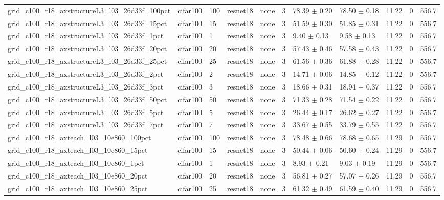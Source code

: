\begin{tabular}{lllllllllll}
grid_c100_r18_axstructureL3_l03_26d33f_100pct & cifar100 & 100 & resnet18 & none & 3 & 78.39 $\pm$ 0.20 & 78.50 $\pm$ 0.18 & 11.22 & 0 & 556.7 \\
grid_c100_r18_axstructureL3_l03_26d33f_15pct & cifar100 & 15 & resnet18 & none & 3 & 51.59 $\pm$ 0.30 & 51.85 $\pm$ 0.31 & 11.22 & 0 & 556.7 \\
grid_c100_r18_axstructureL3_l03_26d33f_1pct & cifar100 & 1 & resnet18 & none & 3 & 9.40 $\pm$ 0.13 & 9.58 $\pm$ 0.13 & 11.22 & 0 & 556.7 \\
grid_c100_r18_axstructureL3_l03_26d33f_20pct & cifar100 & 20 & resnet18 & none & 3 & 57.43 $\pm$ 0.46 & 57.58 $\pm$ 0.43 & 11.22 & 0 & 556.7 \\
grid_c100_r18_axstructureL3_l03_26d33f_25pct & cifar100 & 25 & resnet18 & none & 3 & 61.56 $\pm$ 0.36 & 61.88 $\pm$ 0.28 & 11.22 & 0 & 556.7 \\
grid_c100_r18_axstructureL3_l03_26d33f_2pct & cifar100 & 2 & resnet18 & none & 3 & 14.71 $\pm$ 0.06 & 14.85 $\pm$ 0.12 & 11.22 & 0 & 556.7 \\
grid_c100_r18_axstructureL3_l03_26d33f_3pct & cifar100 & 3 & resnet18 & none & 3 & 18.66 $\pm$ 0.31 & 18.94 $\pm$ 0.37 & 11.22 & 0 & 556.7 \\
grid_c100_r18_axstructureL3_l03_26d33f_50pct & cifar100 & 50 & resnet18 & none & 3 & 71.33 $\pm$ 0.28 & 71.54 $\pm$ 0.22 & 11.22 & 0 & 556.7 \\
grid_c100_r18_axstructureL3_l03_26d33f_5pct & cifar100 & 5 & resnet18 & none & 3 & 26.44 $\pm$ 0.17 & 26.62 $\pm$ 0.27 & 11.22 & 0 & 556.7 \\
grid_c100_r18_axstructureL3_l03_26d33f_7pct & cifar100 & 7 & resnet18 & none & 3 & 33.67 $\pm$ 0.55 & 33.79 $\pm$ 0.55 & 11.22 & 0 & 556.7 \\
grid_c100_r18_axteach_l03_10e860_100pct & cifar100 & 100 & resnet18 & none & 3 & 78.48 $\pm$ 0.66 & 78.68 $\pm$ 0.65 & 11.29 & 0 & 556.7 \\
grid_c100_r18_axteach_l03_10e860_15pct & cifar100 & 15 & resnet18 & none & 3 & 50.44 $\pm$ 0.06 & 50.60 $\pm$ 0.24 & 11.29 & 0 & 556.7 \\
grid_c100_r18_axteach_l03_10e860_1pct & cifar100 & 1 & resnet18 & none & 3 & 8.93 $\pm$ 0.21 & 9.03 $\pm$ 0.19 & 11.29 & 0 & 556.7 \\
grid_c100_r18_axteach_l03_10e860_20pct & cifar100 & 20 & resnet18 & none & 3 & 56.81 $\pm$ 0.27 & 57.07 $\pm$ 0.26 & 11.29 & 0 & 556.7 \\
grid_c100_r18_axteach_l03_10e860_25pct & cifar100 & 25 & resnet18 & none & 3 & 61.32 $\pm$ 0.49 & 61.59 $\pm$ 0.40 & 11.29 & 0 & 556.7 \\

\end{tabular}

